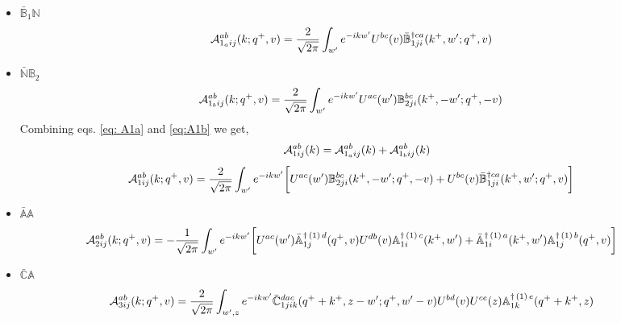 \documentclass[aps,prd,amsmath,amssymb,nofootinbib]{revtex4-2}
\def\mf#1{\mathbb{#1}}
\numberwithin{equation}{section}
\begin{document}
\begin{itemize}
\item $\bar{\mf{B}}_{1} \mf{N}$
\begin{align}\label{eq: A1a}
    {\cal A}^{ab}_{1_{a}ij}(k; q^{+},v) & = \frac{2}{\sqrt{2\pi}}\int_{w^{\prime}}e^{-i k w^\prime} U^{ bc}(v)\Bar{\mf{B}}^{\dagger ca}_{1ji}(k^{+},w^{\prime};q^{+},v)
\end{align}
 \item $\bar{{\mf{N}}}\mf{B}_{2}$
\begin{align} \label{eq:A1b}
        {\cal A}^{ab}_{1_{b}ij}(k; q^{+},v) & = \frac{2}{\sqrt{2\pi}}  \int_{w^{\prime}}e^{-i k w^\prime}U^{ac}(w^{\prime}) \mf{B}^{bc}_{2ji}(k^{+},-w^{\prime};q^{+},-v)
    \end{align}
Combining eqs. \eqref{eq: A1a} and \eqref{eq:A1b} we get,
$${\cal A}^{ab}_{1ij}(k) = {\cal A}^{ab}_{1_{a}ij}(k) + {\cal A}^{ab}_{1_{b}ij}(k)$$
\begin{align}
     {\cal A}^{ab}_{1ij}(k; q^{+},v) & = \frac{2}{\sqrt{2\pi}} \int_{w^{\prime}}e^{-i k w^\prime}\bigg[U^{ac}(w^{\prime}) \mf{B}^{bc}_{2ji}(k^{+},-w^{\prime};q^{+},-v)+U^{ bc}(v)\Bar{\mf{B}}^{\dagger ca}_{1ji}(k^{+},w^{\prime};q^{+},v)\bigg]
\end{align}
   \item $\bar{{\mf{A}}} \mf{A}$
\begin{align} 
     {\cal A}^{ab}_{2ij}(k; q^{+},v) & = -\frac{1}{\sqrt{2\pi}} \int_{w^{\prime}} e^{-ikw^{\prime}}\bigg[U^{ac}(w^{\prime}) \Bar{\mf{A}}^{\dagger\,(1)\, d}_{1j}(q^{+},v)U^{ db}(v) \mf{A}^{\dagger\,(1)\, c}_{1i}(k^{+},w^{\prime})+\Bar{\mf{A}}^{\dagger\,(1)\, a}_{1i}(k^{+},w^{\prime}) \mf{A}^{\dagger\,(1)\, b}_{1j}(q^{+},v)\bigg] 
\end{align}
\item $\bar{{\mf{C}}} \mf{A}$
    \begin{align}
         {\cal A}^{ab}_{3ij}(k; q^{+},v) & = \frac{2}{\sqrt{2\pi}}  \int_{w^{\prime},z} e^{-i k w^\prime}\Bar{\mf{C}}^{dac}_{1jik}(q^{+}+k^{+},z-w^{\prime}; q^{+},w^{\prime}-v)U^{bd}(v)U^{ce}(z) \mf{A}^{\dagger\,(1)\,e}_{1k}(q^{+}+k^{+},z)
    \end{align}
\end{itemize}
\end{document}
